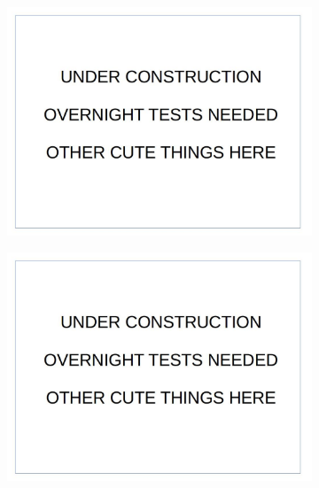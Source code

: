 \documentclass[12pt]{report}
\begin{document}
\begin{figure}
  \centering
  \begin{subfigure}{.49\linewidth}
  \includegraphics[width=1\linewidth]{figures/placeholder.jpg}
  \caption{}
  \end{subfigure}
  \hfill
  \begin{subfigure}{.49\linewidth}
  \includegraphics[width=1\linewidth]{figures/placeholder.jpg}
  \caption{}
  \end{subfigure}
  \hfill
  \begin{subfigure}{.49\linewidth}

\end{subfigure}
\end{figure}
\end{document}
